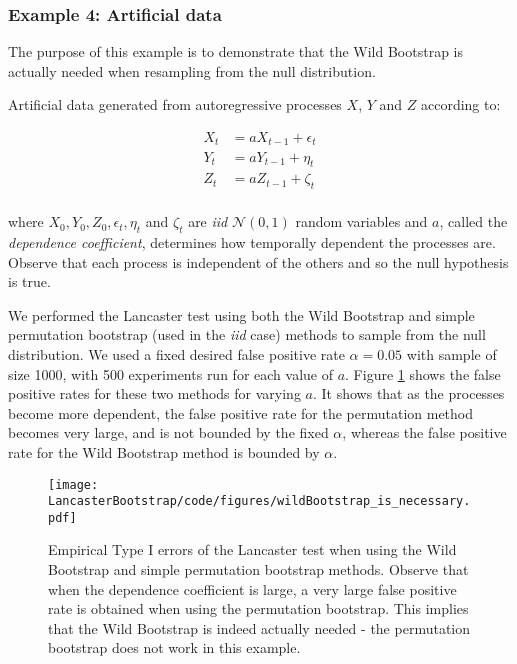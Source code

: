 \documentclass[12pt]{article}
\numberwithin{claim}{section}
\numberwithin{lemma}{section}
\numberwithin{theorem}{section}
\begin{document}
\subsubsection{Example 4: Artificial data}

The purpose of this example is to demonstrate that the Wild Bootstrap is actually needed when resampling from the null distribution.

Artificial data generated from autoregressive processes $X$, $Y$ and $Z$ according to:

\begin{align*}
X_t &= aX_{t-1} + \epsilon_t\\
Y_t &= aY_{t-1} + \eta_t\\
Z_t &= aZ_{t-1} +  \zeta_t\\
\end{align*}

where $X_0, Y_0, Z_0, \epsilon_t, \eta_t$ and $\zeta_t$ are \emph{iid} $\mathcal{N}(0,1)$ random variables and $a$, called the \emph{dependence coefficient}, determines how temporally dependent the processes are. Observe that each process is independent of the others and so the null hypothesis is true.

We performed the Lancaster test using both the Wild Bootstrap and simple permutation bootstrap (used in the \emph{iid} case) methods to sample from the null distribution. We used a fixed desired false positive rate $\alpha = 0.05$ with sample of size 1000, with 500 experiments run for each value of $a$. Figure \ref{fig:wbnec} shows the false positive rates for these two methods for varying $a$. It shows that as the processes become more dependent, the false positive rate for the permutation method becomes very large, and is not bounded by the fixed $\alpha$, whereas the false positive rate for the Wild Bootstrap method is bounded by $\alpha$.

\begin{figure}[htbp]
  \centering
  \texttt{[image: LancasterBootstrap/code/figures/wildBootstrap\_is\_necessary.pdf]}
  \caption{Empirical Type I errors of the Lancaster test when using the Wild Bootstrap and simple permutation bootstrap methods. Observe that when the dependence coefficient is large, a very large false positive rate is obtained when using the permutation bootstrap. This implies that the Wild Bootstrap is indeed actually needed - the permutation bootstrap does not work in this example.}
  \label{fig:wbnec}
\end{figure}
\end{document}
